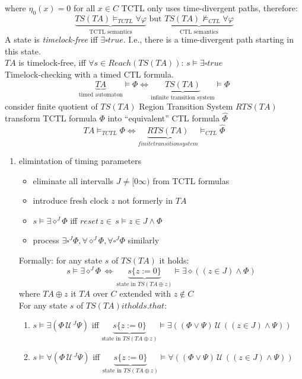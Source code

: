 \documentclass[a4paper, 10pt]{article}
\newcommand{\until}{\,\mathcal{U}\,}
\begin{document}
\begin{mdframed}
where $\eta_0(x)=0$ for all $x\in C$
TCTL only uses time-divergent paths, therefore:
\[ \underset{\text{TCTL semantics}}{\underbrace{TS(TA)\models_{TCTL} \forall\varphi}} \text{ but } \underset{\text{CTL semantics}}{\underbrace{TS(TA)\not\models_{CTL} \forall\varphi}} \]
A state is \emph{timelock-free} iff $\exists\square true$. I.e., there is a time-divergent path starting in this state.\\
$TA$ is timelock-free, iff $\forall s \in Reach(TS(TA)):\,s\models\exists\square true$\\
\follows Timelock-checking with a timed CTL formula.
\[ \underset{\text{timed automaton}}{\underbrace{TA}}\models\Phi \iff \underset{\text{infinite transition system}}{\underbrace{TS(TA)}}\models\Phi \]
consider finite quotient of $TS(TA)$ \follows Region Transition System $RTS(TA)$ \\
transform TCTL formula $\Phi$ into ``equivalent'' CTL formula $\hat{\Phi}$
\[ TA\models_{TCTL}\Phi \iff \underset{finite transition system}{\underbrace{RTS(TA)}}\models_{CTL}\hat{\Phi} \]
\begin{enumerate}
    \item elimintation of timing parameters
    \begin{itemize}
        \item eliminate all intervalls $J\not=[0\infty)$ from TCTL formulas
        \item introduce fresh clock $z$ not formerly in $TA$
        \item $s\models\exists\diamond^J\Phi$ iff $reset\,z\in\,s\models z\in J\wedge\Phi$
        \item process $\exists\square^J\Phi, \forall\diamond^J\Phi, \forall\square^J\Phi$ similarly
    \end{itemize}
    Formally: for any state $s$ of $TS(TA)$ it holds:
    \[ s\models\exists\diamond^J\Phi\,\iff\,\underset{\text{state in } TS(TA\oplus z)}{\underbrace{s\{z:=0\}}}\models\exists\diamond((z\in J)\wedge\Phi) \] where $TA\oplus z$ it $TA$ over $C$ extended with $z\not\in C$
    \\
    For any state $s$ of $TS(TA) it holds. that:$
    \begin{enumerate}
        \item $s\models\exists(\Phi\until^J\Psi)$ iff $\underset{\text{state in } TS(TA\oplus z)}{\underbrace{s\{z:=0\}}}\models\exists((\Phi\vee\Psi)\until((z\in J)\wedge\Psi))$
        \item $s\models\forall(\Phi\until^J\Psi)$ iff $\underset{\text{state in } TS(TA\oplus z)}{\underbrace{s\{z:=0\}}}\models\forall((\Phi\vee\Psi)\until((z\in J)\wedge\Psi))$

\end{enumerate}
\end{enumerate}
\end{mdframed}
\end{document}
